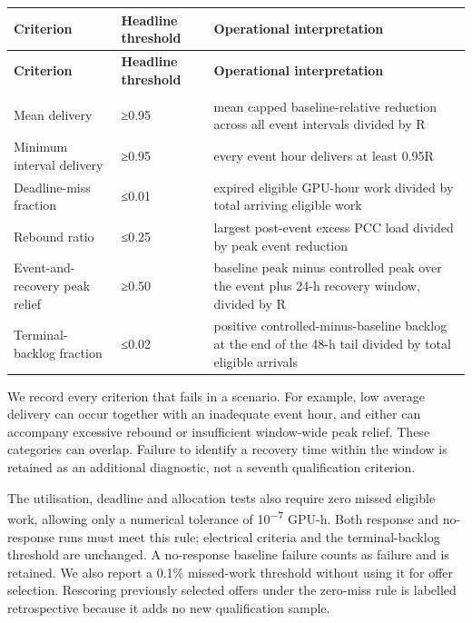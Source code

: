 \documentclass[10pt,a4paper]{article}
\begin{document}
{\footnotesize
\renewcommand{\arraystretch}{1.12}
\begin{longtable}{@{}>{\RaggedRight\arraybackslash}p{}>{\RaggedRight\arraybackslash}p{}>{\RaggedRight\arraybackslash}p{}@{}}
\toprule
\textbf{Criterion} & \textbf{Headline threshold} & \textbf{Operational interpretation} \\
\midrule
\endfirsthead
\toprule
\textbf{Criterion} & \textbf{Headline threshold} & \textbf{Operational interpretation} \\
\midrule
\endhead
\midrule \multicolumn{3}{r}{\scriptsize continued on next page} \\
\endfoot
\bottomrule
\endlastfoot
Mean delivery & ≥0.95 & mean capped baseline-relative reduction across all event intervals divided by R \\
Minimum interval delivery & ≥0.95 & every event hour delivers at least 0.95R \\
Deadline-miss fraction & ≤0.01 & expired eligible GPU-hour work divided by total arriving eligible work \\
Rebound ratio & ≤0.25 & largest post-event excess PCC load divided by peak event reduction \\
Event-and-recovery peak relief & ≥0.50 & baseline peak minus controlled peak over the event plus 24-h recovery window, divided by R \\
Terminal-backlog fraction & ≤0.02 & positive controlled-minus-baseline backlog at the end of the 48-h tail divided by total eligible arrivals \\
\end{longtable}
}

We record every criterion that fails in a scenario. For example, low average delivery can occur together with an inadequate event hour, and either can accompany excessive rebound or insufficient window-wide peak relief. These categories can overlap. Failure to identify a recovery time within the window is retained as an additional diagnostic, not a seventh qualification criterion.


The utilisation, deadline and allocation tests also require zero missed eligible work, allowing only a numerical tolerance of 10\textsuperscript{−7} GPU-h. Both response and no-response runs must meet this rule; electrical criteria and the terminal-backlog threshold are unchanged. A no-response baseline failure counts as failure and is retained. We also report a 0.1\% missed-work threshold without using it for offer selection. Rescoring previously selected offers under the zero-miss rule is labelled retrospective because it adds no new qualification sample.
\end{document}
